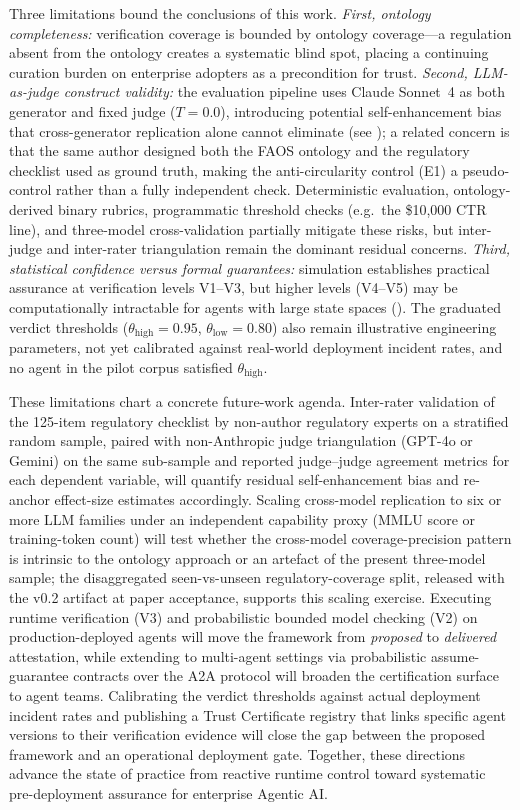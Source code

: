 \documentclass[11pt,a4paper]{article}
\begin{document}
Three limitations bound the conclusions of this work.
\emph{First, ontology completeness:} verification coverage is bounded
by ontology coverage---a regulation absent from the ontology creates
a systematic blind spot, placing a continuing curation burden on
enterprise adopters as a precondition for trust.
\emph{Second, LLM-as-judge construct validity:} the evaluation
pipeline uses Claude Sonnet~4 as both generator and fixed judge
($T{=}0.0$), introducing potential self-enhancement bias that
cross-generator replication alone cannot eliminate (see
); a related concern is that the same author
designed both the FAOS ontology and the regulatory checklist used as
ground truth, making the anti-circularity control (E1) a pseudo-control
rather than a fully independent check. Deterministic evaluation,
ontology-derived binary rubrics, programmatic threshold checks (e.g.\
the \$10{,}000 CTR line), and three-model cross-validation partially
mitigate these risks, but inter-judge and inter-rater triangulation
remain the dominant residual concerns.
\emph{Third, statistical confidence versus formal guarantees:}
simulation establishes practical assurance at verification levels
V1--V3, but higher levels (V4--V5) may be computationally intractable
for agents with large state spaces (\Cref{sec:formal-extensions}).
The graduated verdict thresholds
($\theta_{\text{high}}{=}0.95$, $\theta_{\text{low}}{=}0.80$) also
remain illustrative engineering parameters, not yet calibrated
against real-world deployment incident rates, and no agent in the
pilot corpus satisfied $\theta_{\text{high}}$.

These limitations chart a concrete future-work agenda. Inter-rater
validation of the 125-item regulatory checklist by non-author
regulatory experts on a stratified random sample, paired with
non-Anthropic judge triangulation (GPT-4o or Gemini) on the same
sub-sample and reported judge--judge agreement metrics for each
dependent variable, will quantify residual self-enhancement bias and
re-anchor effect-size estimates accordingly. Scaling cross-model
replication to six or more LLM families under an independent
capability proxy (MMLU score or training-token count) will test
whether the cross-model coverage-precision pattern is intrinsic to the
ontology approach or an artefact of the present three-model sample;
the disaggregated seen-vs-unseen regulatory-coverage split, released
with the v0.2 artifact at paper acceptance, supports this scaling
exercise. Executing runtime verification (V3) and probabilistic
bounded model checking (V2) on production-deployed agents will move
the framework from \emph{proposed} to \emph{delivered} attestation,
while extending to multi-agent settings via probabilistic
assume-guarantee contracts over the A2A protocol will broaden the
certification surface to agent teams. Calibrating the verdict
thresholds against actual deployment incident rates and publishing a
Trust Certificate registry that links specific agent versions to
their verification evidence will close the gap between the proposed
framework and an operational deployment gate. Together, these
directions advance the state of practice from reactive runtime
control toward systematic pre-deployment assurance for enterprise
Agentic AI.
\end{document}
